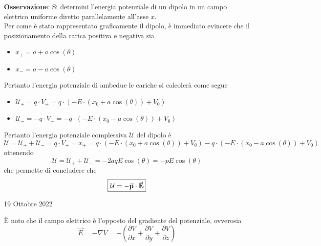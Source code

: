 \documentclass[a4paper]{extarticle}
\begin{document}
\vspace{1em}
\noindent
\textbf{Osservazione}: Si determini l'energia potenziale di un dipolo in un campo elettrico uniforme diretto parallelamente all'asse $x$.\\
Per come è stato rappresentato graficamente il dipolo, è immediato evincere che il posizionamento della carica positiva e negativa sia
\begin{itemize}
  \item $x_+ = a + a \cos(\theta)$
  \item $x_- = a - a \cos(\theta)$
\end{itemize}
Pertanto l'energia potenziale di ambedue le cariche si calcolerà come segue
\begin{itemize}
  \item $\mathcal{U}_+ = q \cdot V_+ = q \cdot \left(-E \cdot (x_0 + a \cos(\theta)) + V_0\right)$
  \item $\mathcal{U}_- = -q \cdot V_-  = -q \cdot \left(-E \cdot (x_0 - a \cos(\theta)) + V_0\right)$
\end{itemize}
Pertanto l'energia potenziale complessiva $\mathcal{U}$ del dipolo è
\[\mathcal{U}=\mathcal{U}_++\mathcal{U}_-=q \cdot V_+ = x_+ = q \cdot \left(-E \cdot (x_0 + a \cos(\theta)) + V_0\right)-q \cdot \left(-E \cdot (x_0 - a \cos(\theta)) + V_0\right)\]
ottenendo
\[\mathcal{U}=\mathcal{U}_++\mathcal{U}_-=-2aqE\cos(\theta)=-pE\cos(\theta)\]
che permette di concludere che
\[\boxed{\mathcal{U} = - \va{p} \cdot \va{E}}\]

\newpage
\begin{center}
  19 Ottobre 2022
\end{center}
È noto che il campo elettrico è l'opposto del gradiente del potenziale, ovverosia
\[\vec E = - \nabla V = - \left(\frac{\partial V}{\partial x} + \frac{\partial V}{\partial y} + \frac{\partial V}{\partial z}\right)\]
\end{document}

